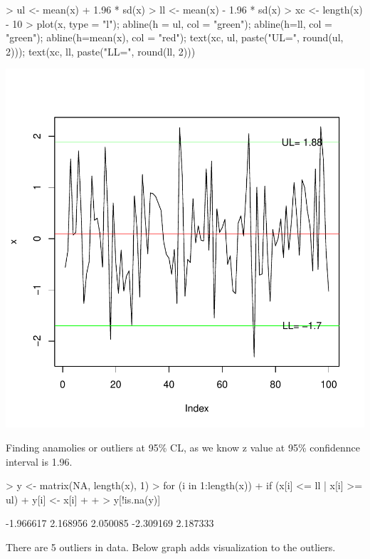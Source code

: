 \documentclass{article}
\begin{document}
\begin{Schunk}
\begin{Sinput}
> ul <- mean(x) + 1.96 * sd(x)
> ll <- mean(x) - 1.96 * sd(x)
> xc <- length(x) - 10 
> plot(x, type = "l"); abline(h = ul, col = "green"); abline(h=ll, col = "green"); abline(h=mean(x), col = "red"); text(xc, ul, paste("UL=", round(ul, 2))); text(xc, ll, paste("LL=", round(ll, 2)))
\end{Sinput}
\end{Schunk}
\includegraphics{anadetect-002}

Finding anamolies or outliers at 95\% CL, as we know z value at 95\% confidennce interval is 1.96. 

\begin{Schunk}
\begin{Sinput}
> y <- matrix(NA, length(x), 1)
> for (i in 1:length(x)){
+   if (x[i] <= ll | x[i] >= ul){
+   y[i] <- x[i]
+ }
+ }
> y[!is.na(y)]
\end{Sinput}
\begin{Soutput}
[1] -1.966617  2.168956  2.050085 -2.309169  2.187333
\end{Soutput}
\end{Schunk}

There are 5 outliers in data. Below graph adds visualization to the outliers. 
\end{document}
